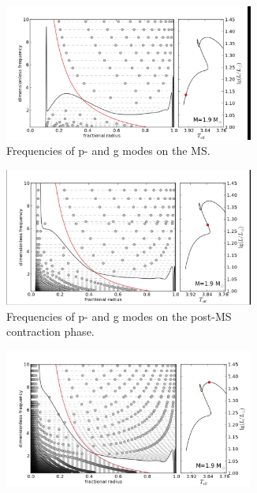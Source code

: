 \begin{figure}
	\centering
	\begin{subfigure}[b]{1\textwidth}
		\centering
		\includegraphics[width=0.9\textwidth, trim={3cm 1.3 1.2cm 1},clip]{propagation1.png}
		\caption{Frequencies of p- and g modes on the MS. }
		\label{fig:y equals x}
	\end{subfigure}
	\hfill
	\begin{subfigure}[b]{1\textwidth}
		\centering
		\includegraphics[width=0.9\textwidth,trim={3cm 1.3 1.2cm 1},clip]{propagation2.png}
		\caption{Frequencies of p- and g modes on the post-MS contraction phase. }
		\label{fig:three sin x}
	\end{subfigure}
	\hfill
	\begin{subfigure}[b]{1\textwidth}
		\centering
		\includegraphics[width=0.9\textwidth,trim={3cm 1.3 1.2cm 1},clip]{propagation3.png}

\end{subfigure}
\end{figure}
